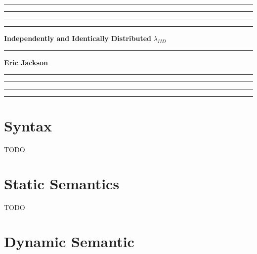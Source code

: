 \documentclass{article}
\begin{document}
	\hrule
	\smallskip
	\hrule\hrule\hrule
	\medskip
	\noindent
	{\huge \bf Independently and Identically Distributed}
	\medskip
	\newline
	{\huge \it $\lambda_{IID}$}
	\smallskip
	\hrule
	\medskip
	\noindent
	{\Large \bf Eric Jackson}
	\medskip
	\hrule\hrule\hrule
	\smallskip
	\hrule

\section{Syntax}

TODO

\section{Static Semantics}

TODO

\section{Dynamic Semantic}

\end{document}
